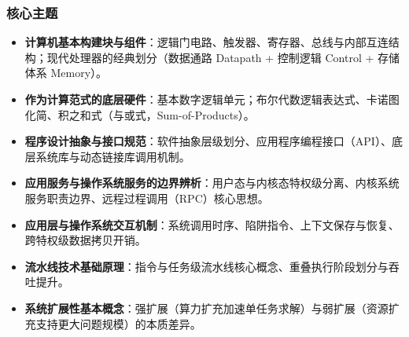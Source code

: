 \subsubsection{核心主题}
\begin{itemize}
    \item \textbf{计算机基本构建块与组件}：逻辑门电路、触发器、寄存器、总线与内部互连结构；现代处理器的经典划分（数据通路 Datapath + 控制逻辑 Control + 存储体系 Memory）。
    \item \textbf{作为计算范式的底层硬件}：基本数字逻辑单元；布尔代数逻辑表达式、卡诺图化简、积之和式（与或式，Sum-of-Products）。
    \item \textbf{程序设计抽象与接口规范}：软件抽象层级划分、应用程序编程接口（API）、底层系统库与动态链接库调用机制。
    \item \textbf{应用服务与操作系统服务的边界辨析}：用户态与内核态特权级分离、内核系统服务职责边界、远程过程调用（RPC）核心思想。
    \item \textbf{应用层与操作系统交互机制}：系统调用时序、陷阱指令、上下文保存与恢复、跨特权级数据拷贝开销。
    \item \textbf{流水线技术基础原理}：指令与任务级流水线核心概念、重叠执行阶段划分与吞吐提升。
    \item \textbf{系统扩展性基本概念}：强扩展（算力扩充加速单任务求解）与弱扩展（资源扩充支持更大问题规模）的本质差异。
\end{itemize}

